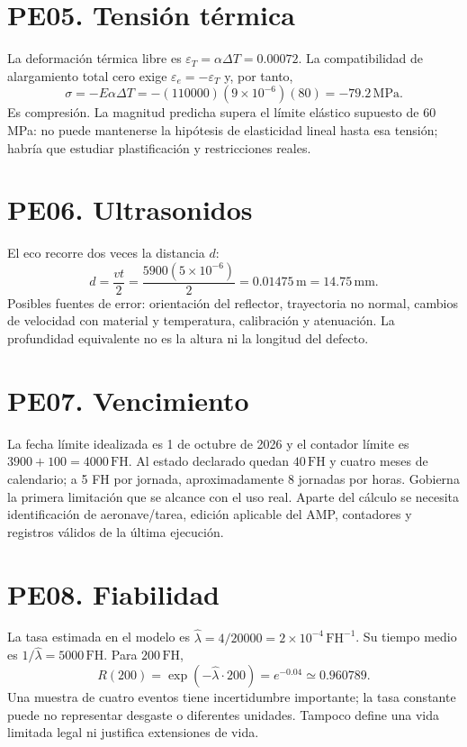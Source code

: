 \section*{PE05. Tensión térmica}
La deformación térmica libre es $\varepsilon_T=\alpha\Delta T=0.00072$. La compatibilidad de alargamiento total cero exige $\varepsilon_e=-\varepsilon_T$ y, por tanto,
\[
\sigma=-E\alpha\Delta T=-(110000)(9\times10^{-6})(80)=-79.2\,\mathrm{MPa}.
\]
Es compresión. La magnitud predicha supera el límite elástico supuesto de 60 MPa: no puede mantenerse la hipótesis de elasticidad lineal hasta esa tensión; habría que estudiar plastificación y restricciones reales.

\section*{PE06. Ultrasonidos}
El eco recorre dos veces la distancia $d$:
\[
d=\frac{vt}{2}=\frac{5900(5\times10^{-6})}{2}
=0.01475\,\mathrm m=14.75\,\mathrm{mm}.
\]
Posibles fuentes de error: orientación del reflector, trayectoria no normal, cambios de velocidad con material y temperatura, calibración y atenuación. La profundidad equivalente no es la altura ni la longitud del defecto.

\section*{PE07. Vencimiento}
La fecha límite idealizada es 1 de octubre de 2026 y el contador límite es $3900+100=4000\,\mathrm{FH}$. Al estado declarado quedan $40\,\mathrm{FH}$ y cuatro meses de calendario; a 5 FH por jornada, aproximadamente 8 jornadas por horas. Gobierna la primera limitación que se alcance con el uso real. Aparte del cálculo se necesita identificación de aeronave/tarea, edición aplicable del AMP, contadores y registros válidos de la última ejecución.

\section*{PE08. Fiabilidad}
La tasa estimada en el modelo es $\widehat\lambda=4/20000=2\times10^{-4}\,\mathrm{FH^{-1}}$. Su tiempo medio es $1/\widehat\lambda=5000\,\mathrm{FH}$. Para $200\,\mathrm{FH}$,
\[
R(200)=\exp(-\widehat\lambda\cdot200)=e^{-0.04}\simeq0.960789.
\]
Una muestra de cuatro eventos tiene incertidumbre importante; la tasa constante puede no representar desgaste o diferentes unidades. Tampoco define una vida limitada legal ni justifica extensiones de vida.
